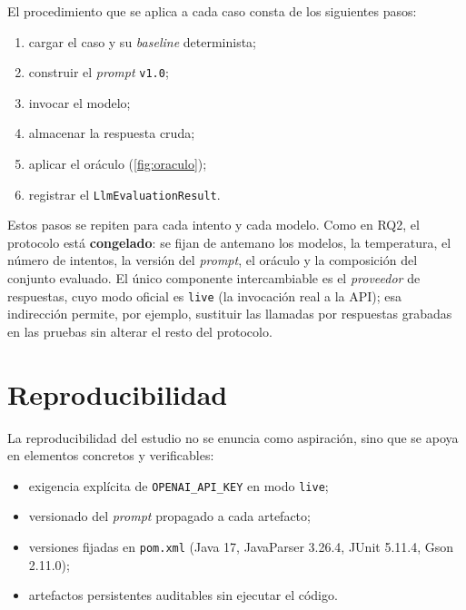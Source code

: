 El procedimiento que se aplica a cada caso consta de los siguientes pasos:
\begin{enumerate}
  \item cargar el caso y su \emph{baseline} determinista;
  \item construir el \emph{prompt} \texttt{v1.0};
  \item invocar el modelo;
  \item almacenar la respuesta cruda;
  \item aplicar el oráculo (\autoref{fig:oraculo});
  \item registrar el \texttt{LlmEvaluationResult}.
\end{enumerate}
Estos pasos se repiten para cada intento y cada modelo. Como en RQ2, el
protocolo está \textbf{congelado}: se fijan de antemano los modelos, la
temperatura, el número de intentos, la versión del \emph{prompt}, el oráculo y
la composición del conjunto evaluado. El único componente intercambiable es el
\emph{proveedor} de respuestas, cuyo modo oficial es \lstinline|live| (la
invocación real a la API); esa indirección permite, por ejemplo, sustituir las
llamadas por respuestas grabadas en las pruebas sin alterar el resto del
protocolo.

\section{Reproducibilidad}
La reproducibilidad del estudio no se enuncia como aspiración, sino que se apoya
en elementos concretos y verificables:
\begin{itemize}
  \item exigencia explícita de \lstinline|OPENAI_API_KEY| en modo \lstinline|live|;
  \item versionado del \emph{prompt} propagado a cada artefacto;
  \item versiones fijadas en \texttt{pom.xml} (Java 17, JavaParser 3.26.4,
  JUnit 5.11.4, Gson 2.11.0);
  \item artefactos persistentes auditables sin ejecutar el código.
\end{itemize}

